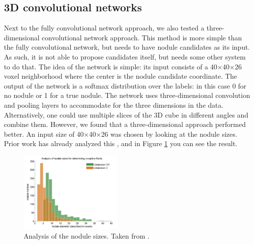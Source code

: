 \documentclass{article}
\begin{document}
	\subsection{3D convolutional networks}
	Next to the fully convolutional network approach, we also tested a three-dimensional convolutional network approach.
	This method is more simple than the fully convolutional network, but needs to have nodule candidates as its input.
	As such, it is not able to propose candidates itself, but needs some other system to do that.
	The idea of the network is simple: its input consists of a 40$\times$40$\times$26 voxel neighborhood where the center is the nodule candidate coordinate.
	The output of the network is a softmax distribution over the labels: in this case 0 for no nodule or 1 for a true nodule.
	The network uses three-dimensional convolution and pooling layers to accommodate for the three dimensions in the data.
	Alternatively, one could use multiple slices of the 3D cube in different angles and combine them.
	However, we found that a three-dimensional approach performed better.
	An input size of 40$\times$40$\times$26 was chosen by looking at the nodule sizes.
	Prior work has already analyzed this \cite{qidou}, and in Figure \ref{fig:nodulesizes} you can see the result.
	
	\begin{figure}[tb]
		\centering
		\includegraphics[width=0.45\textwidth]{nodulesizes.png}
		\caption{Analysis of the nodule sizes. Taken from \cite{qidou}.}
		\label{fig:nodulesizes}
	\end{figure}
	
\end{document}

